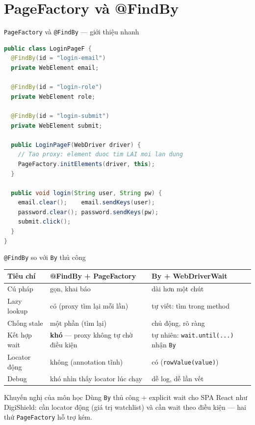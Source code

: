 \documentclass[aspectratio=169,12pt]{beamer}
\begin{document}
\section{PageFactory và @FindBy}

\begin{frame}[fragile]{\texttt{PageFactory} và \texttt{@FindBy} --- giới thiệu nhanh}
\begin{lstlisting}[language=Java,basicstyle=\ttfamily\scriptsize]
public class LoginPageF {
  @FindBy(id = "login-email")
  private WebElement email;

  @FindBy(id = "login-role")
  private WebElement role;

  @FindBy(id = "login-submit")
  private WebElement submit;

  public LoginPageF(WebDriver driver) {
    // Tao proxy: element duoc tim LAI moi lan dung
    PageFactory.initElements(driver, this);
  }

  public void login(String user, String pw) {
    email.clear();    email.sendKeys(user);
    password.clear(); password.sendKeys(pw);
    submit.click();
  }
}
\end{lstlisting}
\end{frame}

\begin{frame}{\texttt{@FindBy} so với \texttt{By} thủ công}
  \begin{center}
  \footnotesize
  \begin{tabular}{p{3.4cm}p{4.0cm}p{4.2cm}}
    \toprule
    \textbf{Tiêu chí} & \textbf{@FindBy + PageFactory}
      & \textbf{By + WebDriverWait} \\
    \midrule
    Cú pháp          & gọn, khai báo & dài hơn một chút \\
    Lazy lookup      & có (proxy tìm lại mỗi lần)
      & tự viết: tìm trong method \\
    Chống stale      & một phần (tìm lại)
      & chủ động, rõ ràng \\
    Kết hợp wait     & \textbf{khó} --- proxy không tự chờ
      điều kiện & tự nhiên: \texttt{wait.until(...)} nhận
      \texttt{By} \\
    Locator động     & không (annotation tĩnh)
      & có (\texttt{rowValue(value)}) \\
    Debug            & khó nhìn thấy locator lúc chạy
      & dễ log, dễ lần vết \\
    \bottomrule
  \end{tabular}
  \end{center}

  \begin{block}{Khuyến nghị của môn học}
    Dùng \texttt{By} thủ công + explicit wait cho SPA React như
    DigiShield: cần locator động (giá trị watchlist) và cần wait
    theo điều kiện --- hai thứ \texttt{PageFactory} hỗ trợ kém.
  \end{block}
\end{frame}
\end{document}
